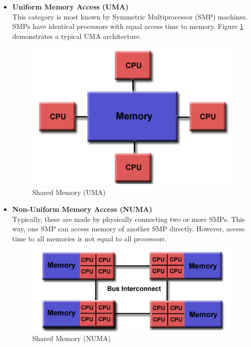 \begin{itemize}
\item \textbf{Uniform Memory Access (UMA)}\\
  This category is most known by Symmetric Multiprocessor (SMP) machines. SMPs have identical processors with equal access time to memory. Figure \ref{fig:shared_memory_UMA} demonstrates a typical UMA architecture.\\
  \begin{figure}[h!]
    \centering
    \includegraphics[scale=0.6]{images/shared_mem.png}
    \caption{Shared Memory (UMA)}
    \label{fig:shared_memory_UMA}
  \end{figure}

\item \textbf{Non-Uniform Memory Access (NUMA)}\\
  Typically, these are made by physically connecting two or more SMPs. This way, one SMP can access memory of another SMP directly. However, access time to all memories is not equal to all processors.
  
  \begin{figure}[h!]
    \centering
    \includegraphics[scale=0.6]{images/numa.png}
    \caption{Shared Memory (NUMA)}
    \label{fig:shared_memory_NUMA}
  \end{figure}

\end{itemize}


